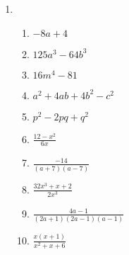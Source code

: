 {\begin{multicols}{3}
\begin{enumerate}[noitemsep, label=\textbf{\arabic*}. ]
\begin{enumerate}[noitemsep, label=\textbf{(\alph*)} ] 
\item $(a - 3)(a + 3)$%
\item $(m + 6)(m - 6)$%
\item $(3b - 9)(3b + 9)$%
\item $(4b + 5a)(4b - 5a)$%
\item $(m +\frac{1}{3})(m -\frac{1}{3})$%
\item $5(1 - ab^3)(1 + ab^3)$%
\item $b(4a^2 - 9)(2a + 3)(2a - 3)$%
\item $(a - 5)(a - 5)$%
\item $(4b + 7)(4b + 7)$%
\item $(2a - 6b)(a - 3b)$%
\item $-4b^2(6b^3 - 1)(6b^3 - 1)$%
\item $(2 - x)(2 + x)(4 + x^2)$%
\item $7(x - 2)(x + y)$%
\item $(y - 10)(y + 3)$%
\item $(1 - x)^{2}(1 +x)$%
\item $(p - 1)(-3p-2)$%
\item $(x+y)(1-x^2+xy-y^2)$
\item $(x-1-y^2)(x-1+y^2)$
\item $4b(x^3-1)(1-x)$
\item $3(p-\frac{1}{3})(p^2+\frac{p}{3}+\frac{1}{9})$
\item $(2x^2-5y^3)(4x^4+10x^2y^3+25y^6)$
\item $(-p)(12+18p+7p^2)$
\end{enumerate}


\item %

\begin{enumerate}[noitemsep, label=\textbf{(\alph*)} ] 

\item$-8a + 4$%
\item $125a^3 - 64b^3$ %
\item $16m^4 - 81$%
\item $a^2 + 4ab + 4b^2 - c^2$%
\item $p^2 - 2pq +q^2$%
\item $\frac{12 - x^2}{6x}$%
\item $\frac{-14}{(a+7)(a-7)}$
\item $\frac{32x^3+x+2}{2x^3}$
\item $\frac{4a-1}{(2a+1)(2a-1)(a-1)}$
\item $\frac{x(x+1)}{x^2+x+6}$
\end{enumerate}



\end{enumerate}
\end{multicols}}
